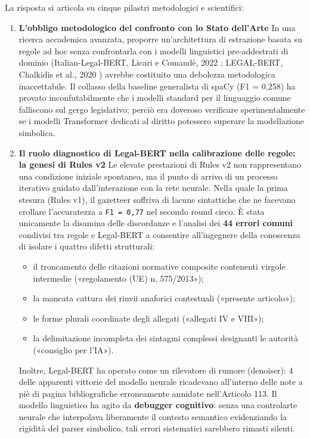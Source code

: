 \documentclass[12pt,a4paper,oneside]{report}
\begin{document}
La risposta si articola su cinque pilastri metodologici e scientifici:
\begin{enumerate}
    \item \textbf{L'obbligo metodologico del confronto con lo Stato dell'Arte}
    In una ricerca accademica avanzata, proporre un'architettura di estrazione basata su regole ad hoc senza confrontarla con i modelli linguistici pre-addestrati di dominio (Italian-Legal-BERT, Licari e Comandè, 2022 \cite{licari2022italianlegalbert}; LEGAL-BERT, Chalkidis et al., 2020 \cite{chalkidis2020legalbert}) avrebbe costituito una debolezza metodologica inaccettabile. Il collasso della baseline generalista di spaCy (F1 = 0,258) ha provato inconfutabilmente che i modelli standard per il linguaggio comune falliscono sul gergo legislativo; perciò era doveroso verificare sperimentalmente se i modelli Transformer dedicati al diritto potessero superare la modellazione simbolica.
    \item \textbf{Il ruolo diagnostico di Legal-BERT nella calibrazione delle regole: la genesi di Rules v2}
    Le elevate prestazioni di Rules v2 non rappresentano una condizione iniziale spontanea, ma il punto di arrivo di un processo iterativo guidato dall'interazione con la rete neurale. Nella quale la prima stesura (Rules v1), il gazetteer soffriva di lacune sintattiche che ne facevano crollare l'accuratezza a \texttt{F1 = 0,77} nel secondo round cieco. È stata unicamente la disamina delle discordanze e l'analisi dei \textbf{44 errori comuni} condivisi tra regole e Legal-BERT a consentire all'ingegnere della conoscenza di isolare i quattro difetti strutturali:
    \begin{itemize}
        \item il troncamento delle citazioni normative composite contenenti virgole intermedie («regolamento (UE) n, 575/2013»);
        \item la mancata cattura dei rinvii anaforici contestuali («presente articolo»);
        \item le forme plurali coordinate degli allegati («allegati IV e VIII»);
        \item la delimitazione incompleta dei sintagmi complessi designanti le autorità («consiglio per l'IA»).
    \end{itemize}

Inoltre, Legal-BERT ha operato come un rilevatore di rumore (denoiser): 4 delle apparenti vittorie del modello neurale ricadevano all'interno delle note a piè di pagina bibliografiche erroneamente annidate nell'Articolo 113. Il modello linguistico ha agito da \textbf{debugger cognitivo}: senza una controlarte neurale che interpolava liberamente il contesto semantico evidenziando la rigidità del parser simbolico, tali errori sistematici sarebbero rimasti silenti.



\end{enumerate}
\end{document}
